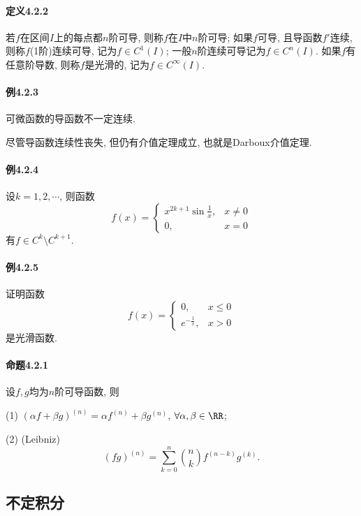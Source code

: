 \paragraph{定义4.2.2}

若$f$在区间$I$上的每点都$n$阶可导, 则称$f$在$I$中$n$阶可导; 如果$f$可导, 且导函数$f'$连续,
则称$f$(1阶)连续可导, 记为$f\in C^{1}(I)$; 一般$n$阶连续可导记为$f\in C^{n}(I)$.
如果$f$有任意阶导数, 则称$f$是光滑的, 记为$f\in C^{\infty}(I)$.

\paragraph{例4.2.3}

可微函数的导函数不一定连续.

尽管导函数连续性丧失, 但仍有介值定理成立, 也就是Darboux介值定理.

\paragraph{例4.2.4}

设$k=1,2,\cdots$, 则函数
\[
f(x)=\begin{cases}
x^{2k+1}\sin\frac{1}{x}, & x\neq0\\
0, & x=0
\end{cases}
\]
有$f\in C^{k}\setminus C^{k+1}$.

\paragraph{例4.2.5}

证明函数
\[
f(x)=\begin{cases}
0, & x\leqslant0\\
e^{-\frac{1}{x}}, & x>0
\end{cases}
\]
是光滑函数.

\paragraph{命题4.2.1}

设$f,g$均为$n$阶可导函数, 则

(1) $(\alpha f+\beta g)^{(n)}=\alpha f^{(n)}+\beta g^{(n)}$, $\forall\alpha,\beta\in\RR$;

(2) (Leibniz) 
\[
(fg)^{(n)}=\sum_{k=0}^{n}\binom{n}{k}f^{(n-k)}g^{(k)}.
\]


\subsection{不定积分}

